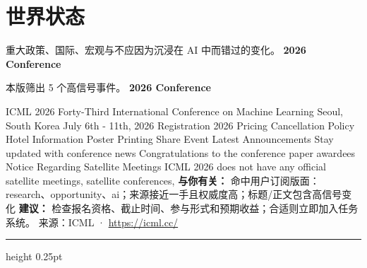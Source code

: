 \documentclass[10.5pt]{ctexart}
\begin{document}
\section*{世界状态}
{\color{ormuted} 重大政策、国际、宏观与不应因为沉浸在 AI 中而错过的变化。}
\vspace{2mm}
{\LARGE\bfseries 2026 Conference}\par
\vspace{1mm}
{\color{ormuted} 本版筛出 5 个高信号事件。}
\vspace{3mm}
{\Large\bfseries 2026 Conference}\par
ICML 2026 Forty-Third International Conference on Machine Learning Seoul, South Korea July 6th - 11th, 2026 Registration 2026 Pricing Cancellation Policy Hotel Information Poster Printing Share Event Latest Announcements Stay updated with conference news Congratulations to the conference paper awardees Notice Regarding Satellite Meetings ICML 2026 does not have any official satellite meetings, satellite conferences, 
\textbf{与你有关：} 命中用户订阅版面：research、opportunity、ai；来源接近一手且权威度高；标题/正文包含高信号变化
\textbf{建议：} 检查报名资格、截止时间、参与形式和预期收益；合适则立即加入任务系统。
{\footnotesize\color{ormuted} 来源：ICML · \url{https://icml.cc/}}
\vspace{4mm}
\hrule height 0.25pt
\vspace{3mm}
\end{document}
